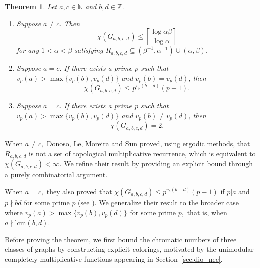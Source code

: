 \documentclass[12pt, reqno, a4paper]{amsart}
\newtheorem{theorem}{Theorem}[section]
\theoremstyle{definition}
\theoremstyle{remark}
\numberwithin{equation}{section}
\renewcommand{\leq}{\leqslant}
\begin{document}
 
\begin{theorem} \label{thm:nec}
Let \( a, c \in \mathbb{N} \) and \( b, d \in \mathbb{Z} \).  
\begin{enumerate}[label=\textnormal{(\roman*)}]
    \item Suppose \( a \ne c \). Then
    \[
    \chi(G_{a,b,c,d}) \leq \left\lceil \frac{\log \alpha\beta}{\log \alpha} \right\rceil
    \]
    for any $1<\alpha<\beta$ satisfying $R_{a,b,c,d} \subseteq (\beta^{-1},\alpha^{-1}) \cup (\alpha,\beta).$


    \item Suppose \( a = c \). If there exists a prime \( p \) such that \( v_p(a) > \max\{ v_p(b), v_p(d) \} \) and \( v_p(b) = v_p(d) \), then
    \[
    \chi(G_{a,b,c,d}) \leq p^{v_p(b - d)}(p - 1).
    \]

    \item Suppose \( a = c \). If there exists a prime \( p \) such that \( v_p(a) > \max\{ v_p(b), v_p(d) \} \) and \( v_p(b) \ne v_p(d) \), then
    \[
    \chi(G_{a,b,c,d}) = 2.
    \]
\end{enumerate}
\end{theorem}

When $a \neq c,$ Donoso, Le, Moreira and Sun \cite[Lemma 3.1]{MR4594405} proved, using ergodic methods, that $R_{a,b,c,d}$ is not a set of topological multiplicative recurrence, which is equivalent to $\chi(G_{a,b,c,d})<\infty$. We refine their result by providing an explicit bound through a purely combinatorial argument. 

When $a=c,$ they also proved 
that $\chi(G_{a,b,c,d}) \leq p^{v_p(b - d)}(p - 1)$ if $p | a$ and $p \nmid bd$ for some prime $p$ (see \cite[Proposition 3.3]{MR4594405}). We generalize their result to the broader case where $ v_p(a) > \max\{ v_p(b), v_p(d) \} $ for some prime $p,$ that is, when $a \nmid \mathrm{lcm}(b,d).$

Before proving the theorem, we first bound the chromatic numbers of three classes of graphs by constructing explicit colorings, motivated by the unimodular completely multiplicative functions appearing in Section~\ref{sec:dio_nec}.
\end{document}
